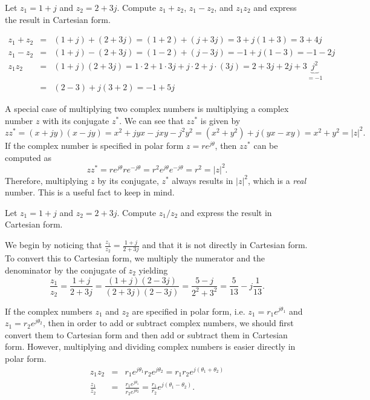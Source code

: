 \begin{example}
Let $z_1 = 1+j$ and $z_2 = 2 + 3j$. Compute $z_1+z_2$, $z_1-z_2$, and $z_1 z_2$ and express the result in Cartesian form.

\begin{eqnarray*}
z_1 + z_2 & = & (1+j) + (2+3j) = (1+2) + (j+3j) = 3 + j(1+3) = 3 + 4j \\
z_1 - z_2 & = & (1+j) - (2+3j) = (1-2) + (j-3j) = -1 + j(1-3) = -1 -2j \\
z_1 z_2 & = & (1+j) (2+3j) = 1 \cdot 2 + 1 \cdot 3j +j \cdot 2 + j \cdot (3j) = 2 + 3j + 2j + 3\underbrace{j^2}_{=-1}\\
& = & (2-3) + j (3+2) = -1 + 5j
\end{eqnarray*}
\end{example}

A special case of multiplying two complex numbers is multiplying a complex number $z$ with its conjugate $z^*$.
We can see that $zz^*$ is given by
\[
zz^* = (x+jy)(x-jy) = x^2 +j yx - jxy -j^2y^2 = (x^2+y^2)+j(yx-xy) = x^2+y^2 = |z|^2.
\]
If the complex number is specified in polar form $z=re^{j\theta}$, then $zz^*$ can be computed as
\[
zz^* = r e^{j\theta} r e^{-j \theta} = r^2 e^{j \theta} e^{-j \theta} = r^2 = |z|^2.
\]
Therefore, multiplying $z$ by its conjugate, $z^*$ always results in $|z|^2$, which is a {\em real} number. 
This is a useful fact to keep in mind. 

\begin{example}
Let $z_1 = 1+j$ and $z_2 = 2 + 3j$. Compute $z_1/z_2$ and express the result in Cartesian form.

We begin by noticing that $\frac{z_1}{z_2} = \frac{1+j}{2+3j}$ and that it is not directly in Cartesian form.
To convert this to Cartesian form, we multiply the numerator and the denominator by the conjugate of $z_2$ yielding
\[
\frac{z_1}{z_2} = \frac{1+j}{2+3j} = \frac{(1+j)(2-3j)}{(2+3j)(2-3j)} = \frac{5-j}{2^2+3^2} = \frac{5}{13} - j \frac{1}{13}.
\]
\end{example}

If the complex numbers $z_1$ and $z_2$ are specified in polar form, i.e. $z_1 = r_1 e^{j \theta_1}$ and $z_1 = r_2 e^{j \theta_2}$, then in order to add or subtract complex numbers,
we should first convert them to Cartesian form and then add or subtract them in Cartesian form.
However, multiplying and dividing complex numbers is easier directly in polar form. 
\begin{eqnarray}
z_1 z_2 & = & r_1 e^{j \theta_1} r_2 e^{j \theta_2} = r_1 r_2 e^{j (\theta_1+\theta_2)} \\
\frac{z_1}{z_2} & = & \frac{r_1 e^{j \theta_1}}{r_2 e^{j \theta_2}} = 
\frac{r_1}{r_2} e^{j (\theta_1 - \theta_2)}.
\end{eqnarray}

